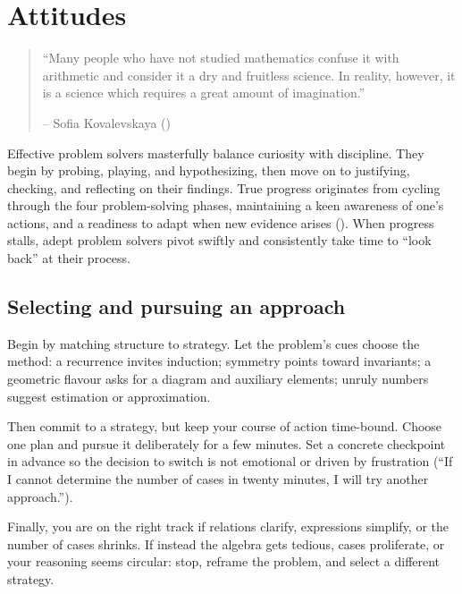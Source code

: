 \documentclass[
  a4paper,
  DIV=11,
  numbers=noendperiod,
  oneside]{scrreprt}
\begin{document}
\chapter{Attitudes}\label{sec-attitudes}

\begin{quote}
``Many people who have not studied mathematics confuse it with
arithmetic and consider it a dry and fruitless science. In reality,
however, it is a science which requires a great amount of imagination.''

-- Sofia Kovalevskaya ()
\end{quote}

Effective problem solvers masterfully balance curiosity with discipline.
They begin by probing, playing, and hypothesizing, then move on to
justifying, checking, and reflecting on their findings. True progress
originates from cycling through the four problem-solving phases,
maintaining a keen awareness of one's actions, and a readiness to adapt
when new evidence arises (). When
progress stalls, adept problem solvers pivot swiftly and consistently
take time to ``look back'' at their process.

\section{Selecting and pursuing an
approach}\label{selecting-and-pursuing-an-approach}

Begin by matching structure to strategy. Let the problem's cues choose
the method: a recurrence invites induction; symmetry points toward
invariants; a geometric flavour asks for a diagram and auxiliary
elements; unruly numbers suggest estimation or approximation.

Then commit to a strategy, but keep your course of action time-bound.
Choose one plan and pursue it deliberately for a few minutes. Set a
concrete checkpoint in advance so the decision to switch is not
emotional or driven by frustration (``If I cannot determine the number
of cases in twenty minutes, I will try another approach.'').

Finally, you are on the right track if relations clarify, expressions
simplify, or the number of cases shrinks. If instead the algebra gets
tedious, cases proliferate, or your reasoning seems circular: stop,
reframe the problem, and select a different strategy.
\end{document}
